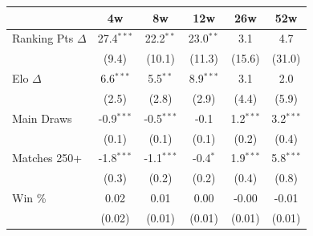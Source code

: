 \begin{tabular}{l*{5}{c}}
\toprule
 & 4w & 8w & 12w & 26w & 52w \\
\midrule
Ranking Pts $\Delta$ & 27.4$^{***}$ & 22.2$^{**}$ & 23.0$^{**}$ & 3.1 & 4.7 \\
 & (9.4) & (10.1) & (11.3) & (15.6) & (31.0) \\[0.3em]
Elo $\Delta$ & 6.6$^{***}$ & 5.5$^{**}$ & 8.9$^{***}$ & 3.1 & 2.0 \\
 & (2.5) & (2.8) & (2.9) & (4.4) & (5.9) \\[0.3em]
Main Draws & -0.9$^{***}$ & -0.5$^{***}$ & -0.1 & 1.2$^{***}$ & 3.2$^{***}$ \\
 & (0.1) & (0.1) & (0.1) & (0.2) & (0.4) \\[0.3em]
Matches 250+ & -1.8$^{***}$ & -1.1$^{***}$ & -0.4$^{*}$ & 1.9$^{***}$ & 5.8$^{***}$ \\
 & (0.3) & (0.2) & (0.2) & (0.4) & (0.8) \\[0.3em]
Win \% & 0.02 & 0.01 & 0.00 & -0.00 & -0.01 \\
 & (0.02) & (0.01) & (0.01) & (0.01) & (0.01) \\[0.3em]
\bottomrule
\end{tabular}

